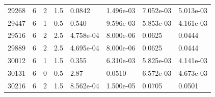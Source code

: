 \documentclass[preview]{standalone}
\begin{document}
{{{{{\begin{tabular}{L{1.2cm}C{1.2cm} C{0.3cm}C{0.5cm} C{1.4cm}C{1.4cm} C{1.4cm}C{1.4cm}}
  29268  &     6  & 2     & 1.5 &  0.0842  & 1.496e-03  & 7.052e-03 &  5.013e-03   \\ 
  29447  &     6  & 1     & 0.5 &  0.540  & 9.596e-03  & 5.853e-03 &  4.161e-03   \\ 
  29516  &     6  & 2     & 2.5 &  4.758e-04  & 8.000e-06  & 0.0625 &  0.0444   \\ 
  29889  &     6  & 2     & 2.5 &  4.695e-04  & 8.000e-06  & 0.0625 &  0.0444   \\ 
  30012  &     6  & 1     & 1.5 &  0.355  & 6.310e-03  & 5.825e-03 &  4.141e-03   \\ 
  30131  &     6  & 0     & 0.5 &  2.87  & 0.0510  & 6.572e-03 &  4.673e-03   \\ 
  30216  &     6  & 2     & 1.5 &  8.562e-04  & 1.500e-05  & 0.0705 &  0.0501   \\ 
\hline 
\end{tabular} 

}}}}}
\end{document}
